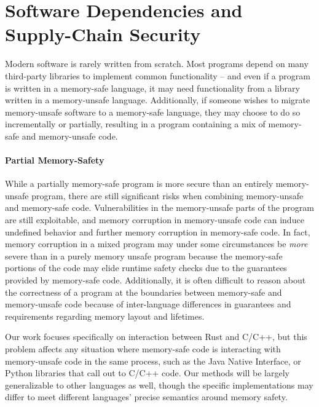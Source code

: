 \section{Software Dependencies and Supply-Chain Security}

Modern software is rarely written from scratch. Most programs depend on many third-party libraries
to implement common functionality -- and even if a program is written in a memory-safe language, it
may need functionality from a library written in a memory-unsafe language. Additionally, if someone
wishes to migrate memory-unsafe software to a memory-safe language, they may choose to do so
incrementally or partially, resulting in a program containing a mix of memory-safe and memory-unsafe
code.

\paragraph{Partial Memory-Safety} While a partially memory-safe program is more secure than an
entirely memory-unsafe program, there are still significant risks when combining memory-unsafe and
memory-safe code. Vulnerabilities in the memory-unsafe parts of the program are still exploitable,
and memory corruption in memory-unsafe code can induce undefined behavior and further memory
corruption in memory-safe code. In fact, memory corruption in a mixed program may under some
circumstances be \textit{more} severe than in a purely memory unsafe program because the memory-safe
portions of the code may elide runtime safety checks due to the guarantees provided by memory-safe
code. Additionally, it is often difficult to reason about the correctness of a program at the
boundaries between memory-safe and memory-unsafe code because of inter-language differences in
guarantees and requirements regarding memory layout and lifetimes.

Our work focuses specifically on interaction between Rust and C/C++, but this problem affects any
situation where memory-safe code is interacting with memory-unsafe code in the same process, such as
the Java Native Interface, or Python libraries that call out to C/C++ code. Our methods will be
largely generalizable to other languages as well, though the specific implementations may differ to
meet different languages' precise semantics around memory safety.

